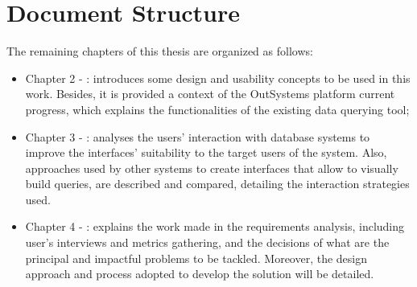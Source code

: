 \section{Document Structure}
\label{sec:document_structure}

The remaining chapters of this thesis are organized as follows:

\begin{itemize}
  \item Chapter 2 - : introduces some design and usability concepts to be used in this work. Besides, it is provided a context of the OutSystems platform current progress, which explains the functionalities of the existing data querying tool;
  \item Chapter 3 - : analyses the users' interaction with database systems to improve the interfaces' suitability to the target users of the system. Also, approaches used by other systems to create interfaces that allow to visually build queries, are described and compared, detailing the interaction strategies used.
  \item Chapter 4 - : explains the work made in the requirements analysis, including user's interviews and metrics gathering, and the decisions of what are the principal and impactful problems to be tackled. Moreover, the design approach and process adopted to develop the solution will be detailed.
\end{itemize}
